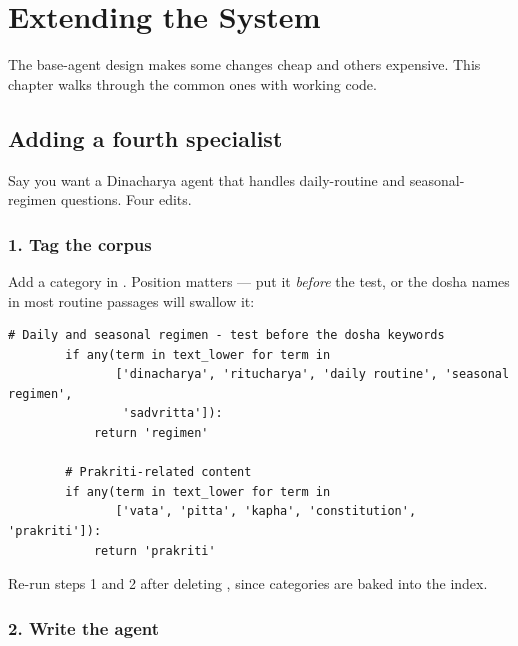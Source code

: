 \chapter{Extending the System}
\label{ch:extend}

The base-agent design makes some changes cheap and others expensive. This chapter walks through the common ones with working code.

\section{Adding a fourth specialist}

Say you want a Dinacharya agent that handles daily-routine and seasonal-regimen questions. Four edits.

\subsection{1. Tag the corpus}

Add a category in . Position matters --- put it \emph{before} the  test, or the dosha names in most routine passages will swallow it:

\begin{lstlisting}[style=py]
        # Daily and seasonal regimen - test before the dosha keywords
        if any(term in text_lower for term in
               ['dinacharya', 'ritucharya', 'daily routine', 'seasonal regimen',
                'sadvritta']):
            return 'regimen'

        # Prakriti-related content
        if any(term in text_lower for term in
               ['vata', 'pitta', 'kapha', 'constitution', 'prakriti']):
            return 'prakriti'
\end{lstlisting}

Re-run steps 1 and 2 after deleting , since categories are baked into the index.

\subsection{2. Write the agent}

